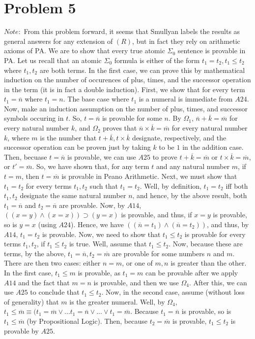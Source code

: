 \documentclass{article}
\theoremstyle{definition}
\begin{document}
\section*{Problem 5} $Note:$ From this problem forward, it seems that Smullyan labels the results as general answers for any extension of $(R)$, but 
in fact they rely on arithmetic axioms of PA.\newline 
 We are to show that every true atomic $\Sigma_0$ sentence is 
provable in PA. Let us recall that an atomic $\Sigma_0$ 
formula is either of the form $t_1=t_2, t_1\le t_2$ where $t_1, t_2$ are both terms. In the first case, we can prove this by mathematical induction 
on the number of occurences of plus, times, and the successor operation in the term (it is in fact a double induction). First, we show that for every term 
$t_1=\overline n$ where $t_1=n$. The base case where $t_1$ is a numeral 
is immediate from $A24$. Now, make an induction assumption on the number of plus, 
times, and successor symbols occuring in $t$. So, $t=\overline n$ is provable for some $n$.
By $\Omega_1$, $\overline n+\overline k=\overline m$ for every
 natural number $k$, and $\Omega_2$ proves
 that $\overline n\times \overline k=\overline m$ for every  
natural number $k$, where $m$ is the number that $t+\overline k, t\times \overline k$ designate, respectively,
and the successor operation can be proven just by taking $k$ to 
be $1$ in the addition case. Then, becuase $t=\overline n$ is provable, we can use $A25$ to prove $t+\overline k=\overline m$ or $t\times \overline k=
\overline m$, or $t'=\overline m$.
So, we have shown that, for any term $t$ and any natural number $m$, if $t=m$, then $t=\overline m$ is provable in Peano 
Arithmetic. Next, we must show that $t_1=t_2$ for every terms $t_1, t_2$ such that $t_1=t_2$. Well, by definition, $t_1=t_2$ iff both $t_1,t_2$ designate 
the same natural number $n$, and hence, by the above result, both $t_1=\overline n$ and $t_2=\overline n$ are provable. 
Now, by $A14$, $((x=y)\wedge (x=x))\supset (y=x)$ is provable, and thus, if $x=y$ is provable, so is $y=x$ (using $A24$). Hence, we have 
$((\overline n=t_1)\wedge (\overline n=t_2))$, and thus, by $A14$, $t_1=t_2$ is provable. Now, we need to show that $t_1\le t_2$ is provable for 
every terms $t_1, t_2$, if $t_1\le t_2$ is true. Well, assume that $t_1\le t_2$. Now, because these are terms, by the above, 
$t_1=\overline n, t_2=\overline m$ are provable 
for some numbers $n$ and $m$. There are then two cases: either $n=m$, or one of $m, n$ is greater than the other. In the first case, $t_1\le m$ is provable, 
as $t_1=m$ can be provable after we apply $A14$ and the fact that $m=n$ is provable, and then we use $\Omega_4$. After this, we can use $A25$ to conclude 
that $t_1\le t_2$.
 Now, in the second case, assume (without 
loss of generality) that $m$ is the greater numeral. Well, by $\Omega_4$, $t_1\le \overline m
\equiv (t_1=\overline m\vee...t_1=\overline n\vee...\vee t_1=\overline m$. Because $t_1=\overline n$ is provable, so is $t_1\le \overline m$ (by 
Propositional Logic). Then, because $t_2=\overline m$ is provable, $t_1\le t_2$ is provable by $A25$.
\end{document}
